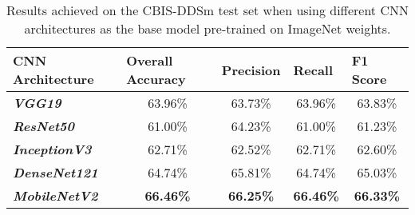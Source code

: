 \begin{table}[h]
\centering
\begin{tabular}{@{}lcccc@{}}
\toprule
\textbf{CNN Architecture} &
  \multicolumn{1}{l}{\textbf{Overall Accuracy}} &
  \multicolumn{1}{l}{\textbf{Precision}} &
  \multicolumn{1}{l}{\textbf{Recall}} &
  \multicolumn{1}{l}{\textbf{F1 Score}} \\ \midrule
\textit{\textbf{VGG19}}       & 63.96\%          & 63.73\%          & 63.96\%          & 63.83\%          \\
\textit{\textbf{ResNet50}}    & 61.00\%          & 64.23\%          & 61.00\%          & 61.23\%          \\
\textit{\textbf{InceptionV3}} & 62.71\%          & 62.52\%          & 62.71\%          & 62.60\%          \\
\textit{\textbf{DenseNet121}} & 64.74\%          & 65.81\%          & 64.74\%          & 65.03\%          \\
\textit{\textbf{MobileNetV2}} & \textbf{66.46\%} & \textbf{66.25\%} & \textbf{66.46\%} & \textbf{66.33\%} \\ \bottomrule
\end{tabular}
\caption{Results achieved on the CBIS-DDSm test set when using different CNN architectures as the base model pre-trained on ImageNet weights.}
\label{tab:evaluation-cnn-models}
\end{table}